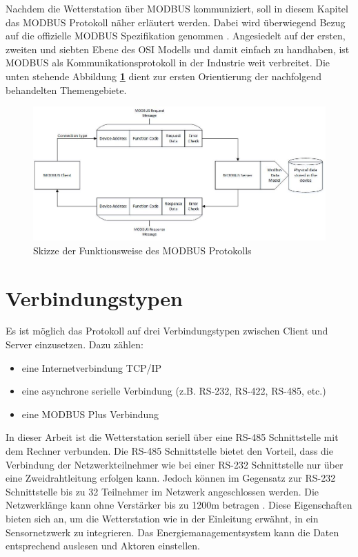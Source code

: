 Nachdem die Wetterstation über MODBUS kommuniziert, soll in diesem Kapitel das MODBUS Protokoll näher erläutert werden. Dabei wird überwiegend Bezug auf die offizielle MODBUS Spezifikation genommen \cite{ModbusDoc}. Angesiedelt auf der ersten, zweiten und siebten Ebene des OSI Modells und damit einfach zu handhaben, ist MODBUS als Kommunikationsprotokoll in der Industrie weit verbreitet. Die unten stehende Abbildung \textbf{\ref{fig:prinzip}} dient zur ersten Orientierung der nachfolgend behandelten Themengebiete. 
\begin{figure}[hbtp]
\centering
\includegraphics[scale=0.65]{modbus/msgskizze}
\caption{Skizze der Funktionsweise des MODBUS Protokolls}
\label{fig:prinzip}
\end{figure}
\section{Verbindungstypen}
Es ist möglich das Protokoll auf drei Verbindungstypen zwischen Client und Server einzusetzen. Dazu zählen: 
\begin{itemize}
\item eine Internetverbindung TCP/IP 
\item eine asynchrone serielle Verbindung (z.B. RS-232, RS-422, RS-485, etc.)
\item eine MODBUS Plus Verbindung  
\end{itemize}
In dieser Arbeit ist die Wetterstation seriell über eine RS-485 Schnittstelle mit dem Rechner verbunden. Die RS-485 Schnittstelle bietet den Vorteil, dass die Verbindung der Netzwerkteilnehmer wie bei einer RS-232 Schnittstelle nur über eine Zweidrahtleitung erfolgen kann. Jedoch können im Gegensatz zur RS-232 Schnittstelle bis zu 32 Teilnehmer im Netzwerk angeschlossen werden. Die Netzwerklänge kann ohne Verstärker bis zu 1200m betragen \cite{Schleicher.2008}. Diese Eigenschaften bieten sich an, um die Wetterstation wie in der Einleitung erwähnt, in ein Sensornetzwerk zu integrieren. Das Energiemanagementsystem kann die Daten entsprechend auslesen und Aktoren einstellen.
